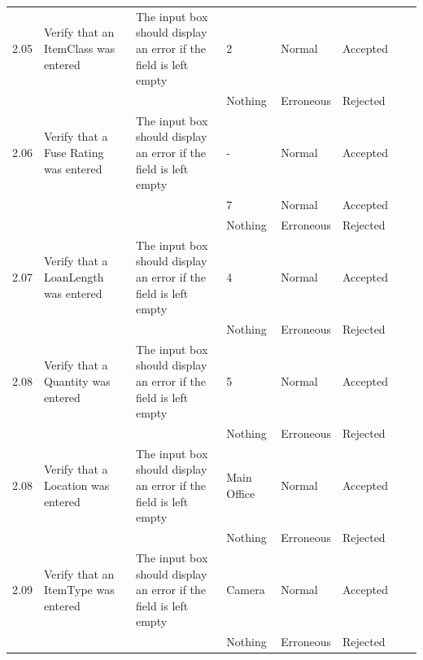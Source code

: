 \begin{landscape}
\begin{center}
\begin{longtable}{|p{1.5cm}|p{2cm}|p{3cm}|p{2cm}|p{2cm}|p{2.5cm}|p{2cm}|p{2cm}|}
        2.05 & Verify that an ItemClass was entered & The input box should display an error if the field is left empty & 2 & Normal & Accepted & & \\   
             &                                      &                                                               & Nothing      & Erroneous & Rejected & & \\ \hline
             
        2.06 & Verify that a Fuse Rating was entered & The input box should display an error if the field is left empty & - & Normal & Accepted & & \\
             &                                        &                                                            & 7       & Normal & Accepted & & \\
             &                                        &                                                            & Nothing       & Erroneous & Rejected & & \\ \hline
             
        2.07 & Verify that a LoanLength was entered & The input box should display an error if the field is left empty & 4 & Normal & Accepted & & \\   
             &                                      &                                                               & Nothing      & Erroneous & Rejected & & \\ \hline
             
        2.08 & Verify that a Quantity was entered & The input box should display an error if the field is left empty & 5 & Normal & Accepted & & \\   
             &                                      &                                                               & Nothing      & Erroneous & Rejected & & \\ \hline

        2.08 & Verify that a Location was entered & The input box should display an error if the field is left empty & Main Office & Normal & Accepted & & \\   
             &                                    &                                                                 & Nothing      & Erroneous & Rejected & & \\ \hline
             
        2.09 & Verify that an ItemType was entered & The input box should display an error if the field is left empty & Camera & Normal & Accepted & & \\   
             &                                      &                                                               & Nothing      & Erroneous & Rejected & & \\ \hline
             

\end{longtable}
\end{center}
\end{landscape}
